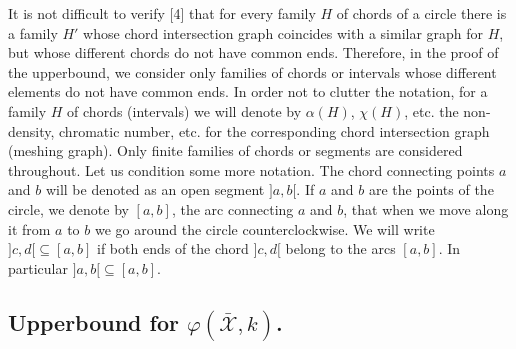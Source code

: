 \documentclass{article}
\begin{document}
    It is not difficult 
    to verify [4] that for 
    every family $H$ of chords of 
    a circle there is a family $H'$ 
    whose chord intersection graph 
    coincides with a similar graph 
    for $H$, but whose different 
    chords do not have common ends. 
    Therefore, in the proof 
    of the upperbound, we consider 
    only families of chords or intervals 
    whose different elements 
    do not have common ends.
    In order not to clutter the notation, 
    for a family $H$ of chords (intervals)
    we will denote by $\alpha\left(H\right)$, 
    $\chi\left(H\right)$, etc. 
    the non-density, chromatic number, etc. 
    for the corresponding chord 
    intersection graph (meshing graph). 
    Only finite families of 
    chords or segments are 
    considered throughout. 
    Let us condition some more notation. 
    The chord connecting points $a$ and $b$ 
    will be denoted as 
    an open segment $]a, b[$. 
    If $a$ and $b$ are 
    the points of the circle, 
    we denote by $[a, b]$, the arc connecting $a$ and $b$, 
    that when we move along it from $a$ to $b$ 
    we go around the circle counterclockwise. 
    We will write $]c, d[ \subseteq [a, b]$ 
    if both ends of the chord $]c, d[$ 
    belong to the arcs $[a, b]$. 
    In particular $]a, b[ \subseteq [a, b]$.

    \subsection{Upperbound for $\varphi\left(\bar{\mathcal{X}}, k\right)$.}
\end{document}
